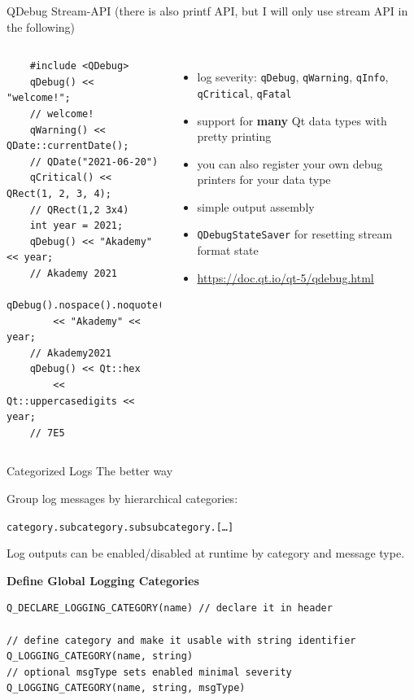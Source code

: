 \documentclass[t,compress,aspectratio=169]{beamer}
\begin{document}
\begin{frame}[fragile]
    {QDebug}
    {Stream-API (there is also printf API, but I will only use stream API in the following)}

    \begin{columns}

    \begin{minipage}{.95\linewidth}
    \begin{lstlisting}
    #include <QDebug>
    qDebug() << "welcome!";
    // welcome!
    qWarning() << QDate::currentDate();
    // QDate("2021-06-20")
    qCritical() << QRect(1, 2, 3, 4);
    // QRect(1,2 3x4)
    int year = 2021;
    qDebug() << "Akademy" << year;
    // Akademy 2021
    qDebug().nospace().noquote()
        << "Akademy" << year;
    // Akademy2021
    qDebug() << Qt::hex
        << Qt::uppercasedigits << year;
    // 7E5
    \end{lstlisting}
    \end{minipage}

    \begin{itemize}
        \item log severity: \texttt{qDebug}, \texttt{qWarning}, \texttt{qInfo}, \texttt{qCritical}, \texttt{qFatal}
        \item<2-> support for \textbf{many} Qt data types with pretty printing
        \item<3-> you can also register your own debug printers for your data type
        \item<4-> simple output assembly
        \item<5-> \texttt{QDebugStateSaver} for resetting stream format state
        \item<6->[$\rightarrow{}$] \url{https://doc.qt.io/qt-5/qdebug.html}
    \end{itemize}
    \end{columns}
\end{frame}


\begin{frame}[fragile]
    {Categorized Logs}
    {The better way}

    Group log messages by hierarchical categories:
    \begin{center}
        \texttt{category.subcategory.subsubcategory.[\dots]}
    \end{center}

    Log outputs can be enabled/disabled at runtime by category and message type.
    \medskip

    \pause
    \textbf{Define Global Logging Categories}
    \begin{verbatim}
Q_DECLARE_LOGGING_CATEGORY(name) // declare it in header

// define category and make it usable with string identifier
Q_LOGGING_CATEGORY(name, string)
// optional msgType sets enabled minimal severity
Q_LOGGING_CATEGORY(name, string, msgType)
    \end{verbatim}
\end{frame}
\end{document}
